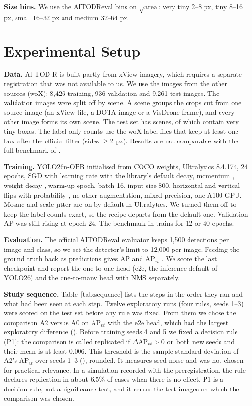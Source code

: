 \documentclass[11pt]{article}
\begin{document}
\textbf{Size bins.} We use the AITODReval bins on $\sqrt{\text{area}}$: very tiny 2--8 px, tiny 8--16 px, small 16--32 px and
medium 32--64 px.

\section{Experimental Setup}
\textbf{Data.} AI-TOD-R \cite{aitodr} is built partly from xView imagery, which requires a separate registration that was not
available to us. We use the images from the other sources (woX): 8,426 training, 936 validation and 9,261 test images. The
validation images were split off by scene. A scene groups the crops cut from one source image (an xView tile, a DOTA image
or a VisDrone frame), and every other image forms its own scene. The test set has \nScenesTest{} scenes, of which \nScenesVt{} contain
very tiny boxes. The label-only counts use the woX label files that keep at least one box after the official filter (sides
$\geq 2$ px). Results are not comparable with the full benchmark of \cite{aitodr}.

\textbf{Training.} YOLO26n-OBB \cite{yolo26} initialised from COCO weights, Ultralytics 8.4.174, 24 epochs, SGD with learning
rate \lrZero{} with the library's default decay, momentum \momentum, weight decay \wDecay, \warmup{} warm-up epoch, batch 16,
input size 800,
horizontal and vertical flips with probability \flipP, no other augmentation, mixed precision, one A100 GPU. Mosaic and scale
jitter are on by default in Ultralytics. We turned them off to keep the label counts exact, so the recipe departs from the
default one. Validation AP was still rising at epoch 24. The benchmark in \cite{aitodr} trains for 12 or 40 epochs.

\textbf{Evaluation.} The official AITODReval evaluator keeps 1,500 detections per image and class, so we set the detector's
limit to 12,000 per image. Feeding the ground truth back as predictions gives AP \oracleAP{} and AP$_{vt}$ \oracleVt{}. We score
the last checkpoint and report the one-to-one head (e2e, the inference default of YOLO26) and the one-to-many head with NMS
separately.

\textbf{Study sequence.} Table~\ref{tab:sequence} lists the steps in the order they ran and what had been seen at each step.
Twelve exploratory runs (four rules, seeds 1--3) were scored on the test set before any rule was fixed. From them we chose
the comparison A2 versus A0 on AP$_{vt}$ with the e2e head, which had the largest exploratory difference (\dAvtAtwo{}). Before
training seeds 4 and 5 we fixed a decision rule (P1): the comparison is called replicated if $\Delta$AP$_{vt}>0$ on both new
seeds and their mean is at least 0.006. This threshold is the sample standard deviation of A2's AP$_{vt}$ over seeds 1--3
(\aTwoOldSd), rounded. It measures seed noise and was not chosen for practical relevance. In a simulation recorded with the
preregistration, the rule declares replication in about 6.5\% of cases when there is no effect. P1 is a decision rule, not a
significance test, and it reuses the test images on which the comparison was chosen.
\end{document}
